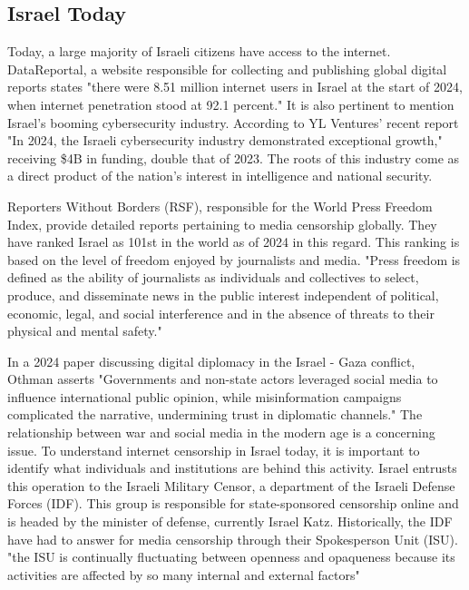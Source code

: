 \subsection{Israel Today}
Today, a large majority of Israeli citizens have access to the internet. DataReportal, a website responsible for collecting and publishing global digital reports states "there were 8.51 million internet users in Israel at the start of 2024, when internet penetration stood at 92.1 percent." \cite{Digital2024Israel} It is also pertinent to mention Israel's booming cybersecurity industry. According to YL Ventures' recent report "In 2024, the Israeli cybersecurity industry demonstrated exceptional growth," receiving \$4B in funding, double that of 2023. The roots of this industry come as a direct product of the nation's interest in intelligence and national security. 


Reporters Without Borders (RSF), responsible for the World Press Freedom Index, provide detailed reports pertaining to media censorship globally. They have ranked Israel as 101st in the world as of 2024 in this regard. This ranking is based on the level of freedom enjoyed by journalists and media. "Press freedom is defined as the ability of journalists as individuals and collectives to select, produce, and disseminate news in the public interest independent of political, economic, legal, and social interference and in the absence of threats to their physical and mental safety." \cite{rsf_israel} 

In a 2024 paper discussing digital diplomacy in the Israel - Gaza conflict, Othman asserts "Governments and non-state actors leveraged social media to influence international public opinion, while misinformation campaigns complicated the narrative, undermining trust in diplomatic channels." \cite{Othman2025DigitalDiplomacy} The relationship between war and social media in the modern age is a concerning issue. To understand internet censorship in Israel today, it is important to identify what individuals and institutions are behind this activity. Israel entrusts this operation to the Israeli Military Censor, a department of the Israeli Defense Forces (IDF). This group is responsible for state-sponsored censorship online and is headed by the minister of defense, currently Israel Katz.\cite{MOD_Israel} Historically, the IDF have had to answer for media censorship through their Spokesperson Unit (ISU). "the ISU is continually fluctuating between openness and opaqueness because its activities are affected by so many internal and external factors" \cite{MAGEN2018287} 


